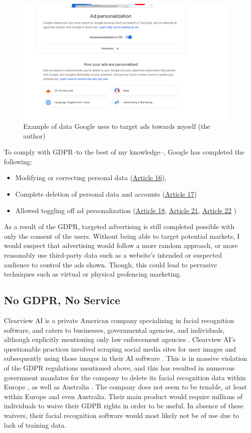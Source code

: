 \documentclass[
	letterpaper, %
]{jdf}
\begin{document}
\begin{figure}
	\centering
	\includegraphics[width=0.7\linewidth]{../figures/google-ads}
	\caption{Example of data Google uses to target ads towards myself (the author)}
	\label{fig:google-ads}
\end{figure}


To comply with GDPR--to the best of my knowledge--, Google has completed the following:
\begin{itemize}
	\item Modifying or correcting personal data (\href{https://gdpr-info.eu/art-16-gdpr/}{Article 16}),
	\item Complete deletion of personal data and accounts (\href{https://gdpr-info.eu/art-17-gdpr/}{Article 17})
	\item Allowed toggling off ad personalization (\href{https://gdpr-info.eu/art-18-gdpr/}{Article 18},  \href{https://gdpr-info.eu/art-21-gdpr/}{Article 21}, \href{https://gdpr-info.eu/art-22-gdpr/}{Article 22} )
\end{itemize}
As a result of the GDPR, targeted advertising is still completed possible with only the consent of the users. Without being able to target potential markets, I would suspect that advertising would follow a more random approach, or more reasonably use third-party data such as a website's intended or suspected audience to control the ads shown. Though, this could lead to pervasive techniques such as virtual or physical geofencing marketing.

\subsection{No GDPR, No Service}
Clearview AI is a private American company specializing in facial recognition software, and caters to businesses, governmental agencies, and individuals, although explicitly mentioning only law enforcement agencies \cite{g2e}.   
Clearview AI's questionable practices involved scraping social media sites for user images and subsequently using those images in their AI software \cite{hill_secretive_2020}. This is in massive violation of the GDPR regulations mentioned above, and this has resulted in numerous government mandates for the company to delete its facial recognition data within Europe \cite{brandom_french_2021}, as well as Australia \cite{australia}. The company does not seem to be tenable, at least within Europe and even Australia. Their main product would require millions of individuals to waive their GDPR rights in order to be useful. In absence of these waivers, their facial recognition software would most likely not be of use due to lack of training data. 

\printbibliography
\end{document}
